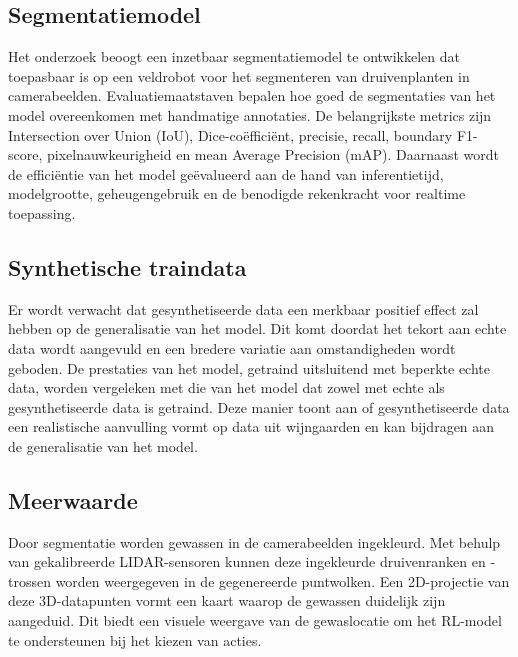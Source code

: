 \subsection{Segmentatiemodel}
Het onderzoek beoogt een inzetbaar segmentatiemodel te ontwikkelen dat toepasbaar is op een veldrobot voor het segmenteren van druivenplanten in camerabeelden. Evaluatiemaatstaven bepalen hoe goed de segmentaties van het model overeenkomen met handmatige annotaties. De belangrijkste metrics zijn Intersection over Union (IoU), Dice-coëfficiënt, precisie, recall, boundary F1-score, pixelnauwkeurigheid en mean Average Precision (mAP). Daarnaast wordt de efficiëntie van het model geëvalueerd aan de hand van inferentietijd, modelgrootte, geheugengebruik en de benodigde rekenkracht voor realtime toepassing.

\subsection{Synthetische traindata}
Er wordt verwacht dat gesynthetiseerde data een merkbaar positief effect zal hebben op de generalisatie van het model. Dit komt doordat het tekort aan echte data wordt aangevuld en een bredere variatie aan omstandigheden wordt geboden. De prestaties van het model, getraind uitsluitend met beperkte echte data, worden vergeleken met die van het model dat zowel met echte als gesynthetiseerde data is getraind. Deze manier toont aan of gesynthetiseerde data een realistische aanvulling vormt op data uit wijngaarden en kan bijdragen aan de generalisatie van het model.

\subsection{Meerwaarde}
Door segmentatie worden gewassen in de camerabeelden ingekleurd. Met behulp van gekalibreerde LIDAR-sensoren kunnen deze ingekleurde druivenranken en -trossen worden weergegeven in de gegenereerde puntwolken. Een 2D-projectie van deze 3D-datapunten vormt een kaart waarop de gewassen duidelijk zijn aangeduid. Dit biedt een visuele weergave van de gewaslocatie om het RL-model te ondersteunen bij het kiezen van acties.



